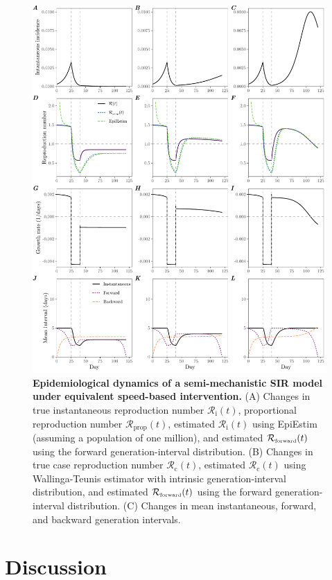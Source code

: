 \documentclass[12pt]{article}
\newcommand{\Rx}[1]{\ensuremath{{\mathcal R}_{#1}}\xspace}
\newcommand{\Rc}{\Rx{\mathrm{c}}}
\newcommand{\Ri}{\Rx{\mathrm{i}}}
\newcommand{\RR}{\ensuremath{{\mathcal R}}\xspace}
\newcommand{\Rprop}{\Rx{\mathrm{prop}}}
\newcommand{\tsub}[2]{#1_{{\textrm{\tiny #2}}}}
\begin{document}
\begin{figure}
\includegraphics[width=\textwidth]{figure_sir_semi.pdf}
\caption{
\textbf{Epidemiological dynamics of a semi-mechanistic SIR model under equivalent speed-based intervention.}
(A) Changes in true instantaneous reproduction number $\Ri(t)$, proportional reproduction number $\Rprop(t)$, estimated $\Ri(t)$ using EpiEstim (assuming a population of one million), and estimated $\tsub{\RR}{forward}(t)$ using the forward generation-interval distribution.
(B) Changes in true case reproduction number $\Rc(t)$, estimated $\Rc(t)$ using Wallinga-Teunis estimator with intrinsic generation-interval distribution, and estimated $\tsub{\RR}{forward}(t)$ using the forward generation-interval distribution.
(C) Changes in mean instantaneous, forward, and backward generation intervals.
}
\label{fig:sir_semi}
\end{figure}

\section{Discussion}
\end{document}
